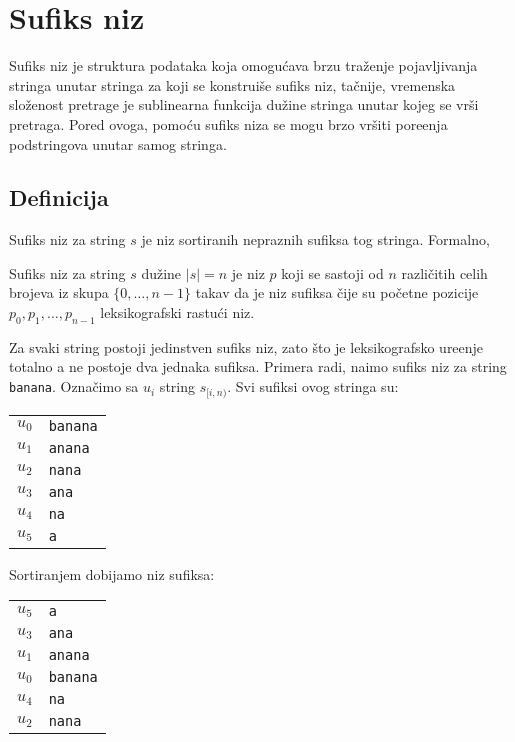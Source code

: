 \section{Sufiks niz}

Sufiks niz je struktura podataka koja omogu\' cava brzu tra\v zenje pojavljivanja stringa unutar stringa za koji se konstrui\v se sufiks niz, ta\v cnije, vremenska slo\v zenost pretrage je sublinearna funkcija du\v zine stringa unutar kojeg se vr\v si pretraga. Pored ovoga, pomo\' cu sufiks niza se mogu brzo vr\v siti pore\dj enja podstringova unutar samog stringa.

\subsection{Definicija}
Sufiks niz za string $s$ je niz sortiranih nepraznih sufiksa tog stringa. Formalno,

\begin{dfn}
Sufiks niz za string $s$ du\v zine $|s| = n$ je niz $p$ koji se sastoji od $n$ razli\v citih celih brojeva iz skupa $\{0,\ldots,n-1\}$ takav da je niz sufiksa \v cije su po\v cetne pozicije $p_0, p_1, \ldots, p_{n-1}$ leksikografski rastu\' ci niz.
\end{dfn}

Za svaki string postoji jedinstven sufiks niz, zato \v sto je leksikografsko ure\dj enje totalno a ne postoje dva jednaka sufiksa. Primera radi, na\dj imo sufiks niz za string \texttt{banana}. Ozna\v cimo sa $u_i$ string $s_{[i,n)}$. Svi sufiksi ovog stringa su:

\begin{center}
\begin{tabular}{cl}
    $u_0$ & \texttt{banana} \\
    $u_1$ & \texttt{anana} \\
    $u_2$ & \texttt{nana} \\
    $u_3$ & \texttt{ana} \\
    $u_4$ & \texttt{na} \\
    $u_5$ & \texttt{a} \\
\end{tabular}
\end{center}

Sortiranjem dobijamo niz sufiksa:

\begin{center}
\begin{tabular}{cl}
    $u_5$ & \texttt{a} \\
    $u_3$ & \texttt{ana} \\
    $u_1$ & \texttt{anana} \\
    $u_0$ & \texttt{banana} \\
    $u_4$ & \texttt{na} \\
    $u_2$ & \texttt{nana} \\
\end{tabular}
\end{center}

